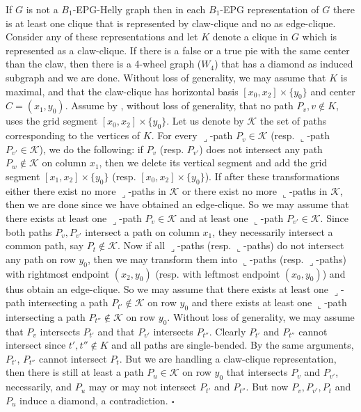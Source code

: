 \documentclass[9pt]{entcs}
\begin{document}
\begin{pf}
If $G$ is not a $B_1$-EPG-Helly graph then in each $B_1$-EPG representation of $G$ there is at least one clique that is represented by claw-clique and no as edge-clique. Consider any of these  representations and let $K$ denote a clique in $G$ which is represented as a claw-clique. %
If there is a false or a true pie with the same center than the claw, then there is a 4-wheel graph ($W_4$) that has a diamond as induced subgraph and we are done.  Without loss of generality, we may assume that $K$ is maximal, and that the claw-clique has horizontal basis $[x_0, x_2]\times\{y_0\}$ and center $C = (x_1, y_0)$. Assume by \cite{ries2009}, without loss of generality, that no path $P_v, v\notin K$, uses the grid segment $[x_0, x_2]\times\{y_0\}$. Let us denote by  $\mathcal{K}$ the set of paths corresponding to the vertices of $K$. For every ${\displaystyle \lrcorner}$-path $P_v \in \mathcal{K}$ (resp. ${\displaystyle \llcorner}$-path $P_{v'} \in \mathcal{K}$), we do the following: if $P_v$ (resp. $P_{v'}$) does not intersect any path $P_w \notin \mathcal{K}$ on column $x_1$, then we delete its vertical segment and add the grid segment $[x_1, x_2]\times\{y_0\}$ (resp. $[x_0, x_2]\times\{y_0\}$). If after these transformations either there exist no more ${\displaystyle \lrcorner}$-paths in $\mathcal{K}$ or there exist no more ${\displaystyle \llcorner}$-paths in $\mathcal{K}$, then we are done since we have obtained an edge-clique. So we may assume that there exists at least one ${\displaystyle \lrcorner}$-path $P_v \in \mathcal{K}$ and at least one ${\displaystyle \llcorner}$-path $P_{v'} \in \mathcal{K}$. Since both paths $P_v, P_{v'}$ intersect a path on column $x_1$, they necessarily intersect a common path, say $P_t \notin \mathcal{K}$. Now if all ${\displaystyle \lrcorner}$-paths (resp. ${\displaystyle \llcorner}$-paths) do not intersect any path on row $y_0$, then we may transform them into ${\displaystyle \llcorner}$-paths (resp. ${\displaystyle \lrcorner}$-paths) with rightmost endpoint $(x_2,y_0)$ (resp. with leftmost endpoint $(x_0,y_0)$) and thus obtain an edge-clique. So we may assume that there exists at least one ${\displaystyle \lrcorner}$-path intersecting a path $P_{t'}\notin \mathcal{K}$ on row $y_0$ and there exists at least one ${\displaystyle \llcorner}$-path intersecting a path $P_{t''}\notin \mathcal{K}$ on row $y_0$. Without loss of generality, we may assume that $P_v$ intersects $P_{t'}$ and that $P_{v'}$ intersects $P_{t''}$. Clearly $P_{t'}$ and $P_{t''}$ cannot intersect since $t', t'' \notin K$ and all paths are single-bended. By the same arguments, $P_{t'}$, $P_{t''}$ cannot intersect $P_{t}$. But we are handling a claw-clique representation, then there is still at least a path $P_{u} \in \mathcal{K}$ on row $y_0$ that intersects $P_{v}$ and $P_{v'}$, necessarily, and $P_{u}$ may or may not intersect $P_{t'}$      and $P_{t''}$. But now $P_{v}, P_{v'}, P_{t}$ and $P_{u}$ induce a diamond, a contradiction.       
  $\square$\end{pf}  
\end{document}
